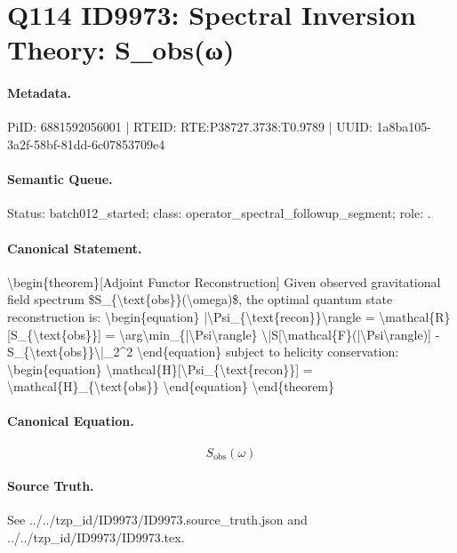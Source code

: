 \section*{Q114 ID9973: Spectral Inversion Theory: S\_obs(ω)}
\paragraph{Metadata.}
PiID: 6881592056001 | RTEID: RTE:P38727.3738:T0.9789 | UUID: 1a8ba105-3a2f-58bf-81dd-6c07853709e4

\paragraph{Semantic Queue.}
Status: batch012\_started; class: operator\_spectral\_followup\_segment; role: .

\paragraph{Canonical Statement.}
\textbackslash{}begin\{theorem\}[Adjoint Functor Reconstruction] Given observed gravitational field spectrum \$S\_\{\textbackslash{}text\{obs\}\}(\textbackslash{}omega)\$, the optimal quantum state reconstruction is: \textbackslash{}begin\{equation\} |\textbackslash{}Psi\_\{\textbackslash{}text\{recon\}\}\textbackslash{}rangle = \textbackslash{}mathcal\{R\}[S\_\{\textbackslash{}text\{obs\}\}] = \textbackslash{}arg\textbackslash{}min\_\{|\textbackslash{}Psi\textbackslash{}rangle\} \textbackslash{}|S[\textbackslash{}mathcal\{F\}(|\textbackslash{}Psi\textbackslash{}rangle)] - S\_\{\textbackslash{}text\{obs\}\}\textbackslash{}|\_2\textasciicircum{}2 \textbackslash{}end\{equation\} subject to helicity conservation: \textbackslash{}begin\{equation\} \textbackslash{}mathcal\{H\}[\textbackslash{}Psi\_\{\textbackslash{}text\{recon\}\}] = \textbackslash{}mathcal\{H\}\_\{\textbackslash{}text\{obs\}\} \textbackslash{}end\{equation\} \textbackslash{}end\{theorem\}

\paragraph{Canonical Equation.}
\[
S_{\text{obs}}(\omega)
\]

\paragraph{Source Truth.}
See ../../tzp\_id/ID9973/ID9973.source\_truth.json and ../../tzp\_id/ID9973/ID9973.tex.
